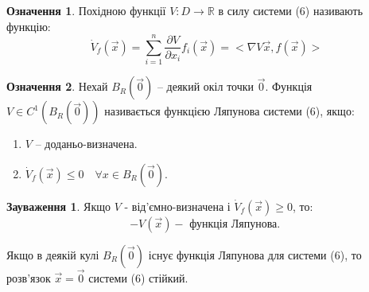 \documentclass[14pt,a4paper]{scrartcl}
\theoremstyle{definition}
\newtheorem*{defo}{Означення}
\newtheorem*{remark}{Зауваження}
\theoremstyle{definition}
\theoremstyle{definition}
\begin{document}
 \begin{defo}
Похідною функції $ V : D \to \mathbb{R}$ в силу системи (6) називають функцію:
$$
\dot{V}_f(\overrightarrow{x}) =  \sum\limits_{i = 1}^{n}{ \frac{\partial V}{ \partial x_i} f_{i}( \overrightarrow{x}) } = <\nabla V \overrightarrow{x}, f(\overrightarrow{x})>
$$
 \end{defo}

\begin{defo}
  Нехай $B_{R} ( \overrightarrow{0} ) $ -- деякий окіл точки $ \overrightarrow{0} $. Функція $V \in C^{1} (B_{R} (\overrightarrow{0}))$ називається функцією Ляпунова системи (6), якщо:
\begin{enumerate}
  \item $V$ -- доданьо-визначена.
  \item $\dot{V}_f (\overrightarrow{x}) \leq 0 \quad \forall x \in B_{R} ( \overrightarrow{0})$.
\end{enumerate}
\end{defo}

\begin{remark}
    Якщо $ V $ - від'ємно-визначена і $ \dot{V}_f ( \overrightarrow{x}) \geq 0$, то: $$ - V ( \overrightarrow{x} ) - \text{ функція Ляпунова. }$$
\end{remark}

\begin{boxteo}
  Якщо в деякій кулі $B_{R}( \overrightarrow{0}) $ існує функція Ляпунова для системи (6), то розв'язок $ \overrightarrow{x} = \overrightarrow{0} $ системи (6) стійкий.
\end{boxteo}
\end{document}
